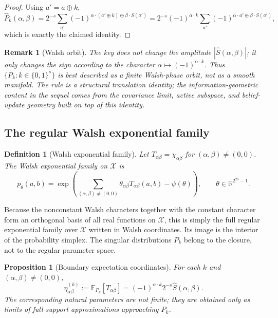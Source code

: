 \documentclass[referee,lineno,pdflatex,sn-mathphys-num]{sn-jnl}
\theoremstyle{thmstylethree}
\newtheorem{definition}{Definition}[section]
\theoremstyle{thmstyletwo}
\newtheorem{remark}{Remark}[section]
\theoremstyle{thmstyleone}
\newtheorem{proposition}{Proposition}[section]
\newcommand{\R}{\mathbb{R}}
\newcommand{\B}[1]{\{0,1\}^{#1}}
\begin{document}
\begin{proof}
Using $a'=a\oplus k$,
\[
\widehat P_k(\alpha,\beta)
=2^{-s}\sum_{a'}(-1)^{\alpha\cdot(a'\oplus k)\oplus\beta\cdot S(a')}
=2^{-s}(-1)^{\alpha\cdot k}\sum_{a'}(-1)^{\alpha\cdot a'\oplus\beta\cdot S(a')},
\]
which is exactly the claimed identity.
\end{proof}

\begin{remark}[Walsh orbit]
The key does not change the amplitude $|\widehat S(\alpha,\beta)|$; it only
changes the sign according to the character $\alpha\mapsto(-1)^{\alpha\cdot k}$.
Thus $\{P_k:k\in\B{s}\}$ is best described as a finite Walsh-phase orbit, not as
a smooth manifold.  The rule is a structural translation identity; the
information-geometric content in the sequel comes from the covariance limit,
active subspace, and belief-update geometry built on top of this identity.
\end{remark}

\subsection{The regular Walsh exponential family}

\begin{definition}[Walsh exponential family]\label{def:walsh-exp}
Let $T_{\alpha\beta}=\chi_{\alpha\beta}$ for
$(\alpha,\beta)\neq(0,0)$.  The Walsh exponential family on $\mathcal X$ is
\begin{equation}\label{eq:walsh-exp}
  p_\theta(a,b)=
  \exp\!\left(\sum_{(\alpha,\beta)\neq(0,0)}
  \theta_{\alpha\beta}T_{\alpha\beta}(a,b)-\psi(\theta)\right),
  \qquad \theta\in\R^{2^{2s}-1}.
\end{equation}
\end{definition}

Because the nonconstant Walsh characters together with the constant character
form an orthogonal basis of all real functions on $\mathcal X$, this is simply
the full regular exponential family over $\mathcal X$ written in Walsh
coordinates.  Its image is the interior of the probability simplex.  The
singular distributions $P_k$ belong to the closure, not to the regular
parameter space.

\begin{proposition}[Boundary expectation coordinates]\label{prop:eta-coords-boundary}
For each $k$ and $(\alpha,\beta)\neq(0,0)$,
\begin{equation}\label{eq:eta-params}
  \eta^{(k)}_{\alpha\beta}
  :=\mathbb E_{P_k}[T_{\alpha\beta}]
  =(-1)^{\alpha\cdot k}2^{-s}\widehat S(\alpha,\beta).
\end{equation}
The corresponding natural parameters are not finite; they are obtained only as
limits of full-support approximations approaching $P_k$.
\end{proposition}
\end{document}
